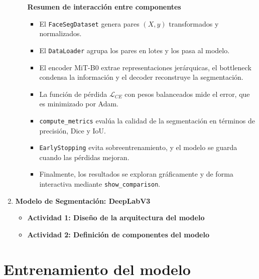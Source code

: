 \begin{enumerate}
\begin{itemize}
\textbf{Resumen de interacción entre componentes}
\begin{itemize}
  \item El \texttt{FaceSegDataset} genera pares \((X, y)\) transformados y normalizados.
  \item El \texttt{DataLoader} agrupa los pares en lotes y los pasa al modelo.
  \item El encoder MiT-B0 extrae representaciones jerárquicas, el bottleneck condensa la información y el decoder reconstruye la segmentación.
  \item La función de pérdida \(\mathcal{L}_{CE}\) con pesos balanceados mide el error, que es minimizado por Adam.
  \item \texttt{compute\_metrics} evalúa la calidad de la segmentación en términos de precisión, Dice y IoU.
  \item \texttt{EarlyStopping} evita sobreentrenamiento, y el modelo se guarda cuando las pérdidas mejoran.
  \item Finalmente, los resultados se exploran gráficamente y de forma interactiva mediante \texttt{show\_comparison}.
\end{itemize}

  \end{itemize}
  \item \textbf{Modelo de Segmentación: DeepLabV3}
  \begin{itemize}
  \item\textbf{Actividad 1: Diseño de la arquitectura del modelo}
  \item\textbf{Actividad 2: Definición de componentes del modelo}

  \end{itemize}
\end{enumerate}


\section{Entrenamiento del modelo}

